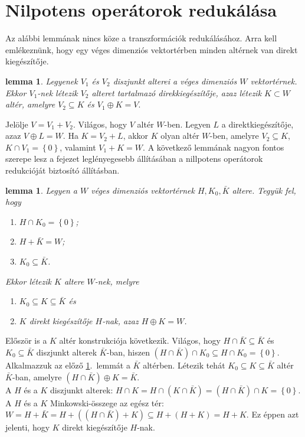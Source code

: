 \documentclass[9pt, a4paper, showtrims]{memoir}
\makeatletter
\renewenvironment{proof}[1][\proofname]
    {\par\pushQED{\qed}%
    \normalfont \topsep6\p@\@plus6\p@\relax
    \trivlist
    \item[\hskip\labelsep
        \itshape
    #1\@addpunct{:}]\ignorespaces}
    {\popQED\endtrivlist\@endpefalse}
\theoremstyle{plain}
\newtheorem{lemma}[proposition]{lemma}
\theoremstyle{remark}
\theoremstyle{definition}
\makeatother
\begin{document}
\section{Nilpotens operátorok redukálása}
Az alábbi lemmának nincs köze a transzformációk redukálásához.
Arra kell emlékeznünk, hogy egy véges dimenziós vektortérben minden altérnek van direkt kiegészítője.
\begin{lemma}
    Legyenek $V_1$ és $V_2$ diszjunkt alterei a véges dimenziós $W$ vektortérnek.
    Ekkor $V_1$-nek létezik $V_2$ alteret tartalmazó direkkiegészítője,
    azaz
    létezik $K\subset W$ altér, amelyre $V_2\subseteq K$ és $V_1\oplus K=V.$
    \label{felb0}
\end{lemma}
\begin{proof}
    Jelölje $V=V_1+V_2$. 
    Világos, hogy $V$ altér $W$-ben.
    Legyen $L$ a direktkiegészítője, azaz $V\oplus L=W$.
    Ha $K=V_2+L$, akkor $K$ olyan altér $W$-ben,
    amelyre $V_2\subseteq K$, $K\cap V_1=\left\{ 0 \right\}$, valamint 
    $V_1+K=W$.
\end{proof}
A következő lemmának nagyon fontos szerepe lesz a fejezet leglényegesebb állításában
a nillpotens operátorok redukcióját biztosító állításban.
\begin{lemma}\label{lem:felb}
    Legyen a $W$ véges dimenziós vektortérnek $H,K_0,\bar{K}$ altere.
    Tegyük fel, hogy 
    \begin{enumerate}\firmlist
        \item $H\cap K_0=\left\{ 0 \right\}$;
        \item $H+\bar{K}=W$;
        \item $K_0\subseteq\bar{K}$.
    \end{enumerate}
    Ekkor létezik $K$ altere $W$-nek, melyre
    \begin{enumerate}\firmlist
        \item $K_0\subseteq K\subseteq\bar{K}$ és
        \item $K$ direkt kiegészítője $H$-nak, azaz 
            $H\oplus K=W$.\qedhere
    \end{enumerate}
\end{lemma}
\begin{proof}
    Először is a $K$ altér konstrukciója következik.
    Világos, hogy $H\cap\bar{K}\subseteq\bar{K}$ és $K_0\subseteq\bar{K}$ diszjunkt alterek
    $\bar{K}$-ban, hiszen
    \(
        \left( H\cap\bar{K} \right)\cap K_0\subseteq
        H\cap K_0=\left\{ 0 \right\}.
    \)
    Alkalmazzuk az előző \ref{felb0}.~lemmát a $\bar{K}$ altérben.
    Létezik tehát $K_0\subseteq K\subseteq \bar{K}$ altér $\bar{K}$-ban, 
    amelyre 
    \(
        \left( H\cap\bar{K} \right)\oplus K=\bar{K}.
    \)
    \\
    A $H$ és a $K$ diszjunkt alterek:
    \(
        H\cap K=H\cap\left( K\cap \bar{K} \right)=\left( H\cap\bar{K} \right)\cap K=\left\{ 0 \right\}.
    \)
    \\
    A $H$ és a $K$ Minkowski-összege az egész tér:
    \(
        W=H+\bar{K}
        =
        H+\left( (H\cap\bar{K})+K \right)
        \subseteq
        H+(H+K) 
        =
        H+K.
    \)
    Ez éppen azt jelenti, hogy $K$ direkt kiegészítője $H$-nak.
\end{proof}
\end{document}
